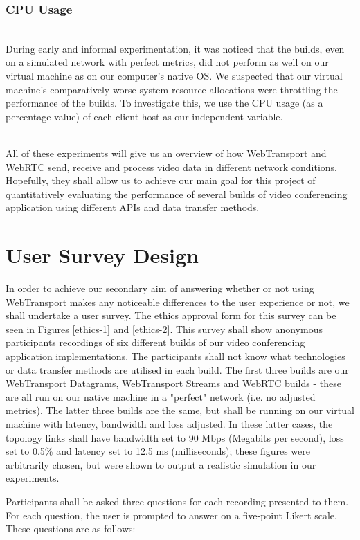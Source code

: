 \subsubsection*{CPU Usage}
\hfill{}\\
During early and informal experimentation, it was noticed that the builds, even on a simulated network with perfect metrics, did not perform as well on our virtual machine as on our computer's native OS. We suspected that our virtual machine's comparatively worse system resource allocations were throttling the performance of the builds. To investigate this, we use the CPU usage (as a percentage value) of each client host as our independent variable.

\hfill{}\\
All of these experiments will give us an overview of how WebTransport and WebRTC send, receive and process video data in different network conditions. Hopefully, they shall allow us to achieve our main goal for this project of quantitatively evaluating the performance of several builds of video conferencing application using different APIs and data transfer methods. 

\section{User Survey Design}

In order to achieve our secondary aim of answering whether or not using WebTransport makes any noticeable differences to the user experience or not, we shall undertake a user survey. The ethics approval form for this survey can be seen in Figures \ref{ethics-1} and \ref{ethics-2}. This survey shall show anonymous participants recordings of six different builds of our video conferencing application implementations. The participants shall not know what technologies or data transfer methods are utilised in each build. The first three builds are our WebTransport Datagrams, WebTransport Streams and WebRTC builds - these are all run on our native machine in a "perfect" network (i.e. no adjusted metrics). The latter three builds are the same, but shall be running on our virtual machine with latency, bandwidth and loss adjusted. In these latter cases, the topology links shall have bandwidth set to 90 Mbps (Megabits per second), loss set to 0.5\% and latency set to 12.5 ms (milliseconds); these figures were arbitrarily chosen, but were shown to output a realistic simulation in our experiments.

Participants shall be asked three questions for each recording presented to them. For each question, the user is prompted to answer on a five-point Likert scale. These questions are as follows:


